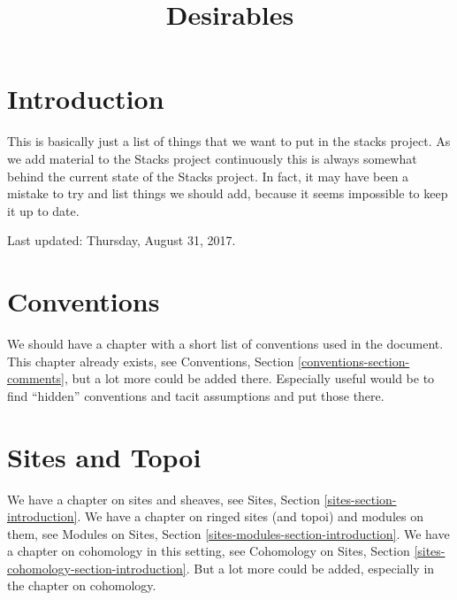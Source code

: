

%


\title{Desirables}

\maketitle

\label{section-phantom}


\tableofcontents

\section{Introduction}
\label{section-introduction}

\noindent
This is basically just a list of things that we want to put in the stacks
project. As we add material to the Stacks project continuously this is always
somewhat behind the current state of the Stacks project. In fact, it may have
been a mistake to try and list things we should add, because it seems
impossible to keep it up to date.

\medskip\noindent
Last updated: Thursday, August 31, 2017.


\section{Conventions}
\label{section-conventions}

\noindent
We should have a chapter with a short list of conventions used in the document.
This chapter already exists, see
Conventions, Section \ref{conventions-section-comments},
but a lot more could be added there. Especially useful would be to find
``hidden'' conventions and tacit assumptions and put those there.


\section{Sites and Topoi}
\label{section-sites}

\noindent
We have a chapter on sites and sheaves, see
Sites, Section \ref{sites-section-introduction}.
We have a chapter on ringed sites (and topoi) and modules on them, see
Modules on Sites, Section \ref{sites-modules-section-introduction}.
We have a chapter on cohomology in this setting, see
Cohomology on Sites, Section \ref{sites-cohomology-section-introduction}.
But a lot more could be added, especially in the chapter on cohomology.


